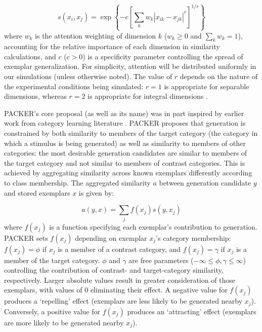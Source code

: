 \documentclass[12pt]{article}
\begin{document}
\begin{flushleft}
\begin{equation}
s\left(x_i,x_j\right) = \exp \left\{ -c \left[\sum_{k}{ w_k \left| x_{ik} - x_{jk} \right|^r }\right]^{1/r} \right\}
\label{eq:similarity}
\end{equation}
% 
where $w_k$ is the attention weighting of dimension $k$ ($w_k \geq 0$ and $\sum_k{w_k} = 1$), accounting for the relative importance of each dimension in similarity calculations, and $c$ ($c>0$) is a specificity parameter controlling the spread of exemplar generalization. For simplicity, attention will be distributed uniformly in our simulations (unless otherwise noted). The value of $r$ depends on the nature of the experimental conditions being simulated: $r=1$ is appropriate for separable dimensions, whereas $r=2$ is appropriate for integral dimensions \citep[see][]{shepard1964attention,garner1974processing}.


PACKER's core proposal (as well as its name) was in part inspired by earlier work from category learning literature \citep[see][]{hidaka2011packing}. PACKER proposes that generation is constrained by both similarity to members of the target category (the category in which a stimulus is being generated) as well as similarity to members of other categories: the most desirable generation candidates are similar to members of the target category and not similar to members of contrast categories. This is achieved by aggregating similarity across known exemplars differently according to class membership. The aggregated similarity $a$ between generation candidate $y$ and stored exemplars $x$ is given by:

\begin{equation}
a(y, x) = \sum_j{f(x_j) s(y, x_j)}
\end{equation}
% 
where $f(x_j)$ is a function specifying each exemplar's contribution to generation. PACKER sets $f(x_j)$ depending on exemplar $x_j$'s category membership: $f(x_j) = \phi$ if $x_j$ is a member of a contrast category, and $f(x_j) = \gamma$ if $x_j$ is a member of the target category. $\phi$ and $\gamma$ are free parameters ($-\infty \leq \phi, \gamma \leq \infty$) controlling the contribution of contrast- and target-category similarity, respectively. Larger absolute values result in greater consideration of those exemplars, with values of 0 eliminating their effect. A negative value for $f(x_j)$ produces a `repelling' effect (exemplars are less likely to be generated nearby $x_j$). Conversely, a positive value for $f(x_j)$ produces an `attracting' effect (exemplars are more likely to be generated nearby $x_j$). 


\end{flushleft}
\end{document}
